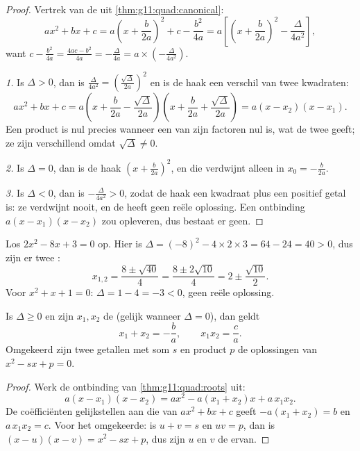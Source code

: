 \begin{proof}
Vertrek van de  uit \cref{thm:g11:quad:canonical}:
\[
ax^2+bx+c
= a\left(x + \frac{b}{2a}\right)^2 + c - \frac{b^2}{4a}
= a\left[\left(x + \frac{b}{2a}\right)^2 - \frac{\Delta}{4a^2}\right],
\]
want $c - \frac{b^2}{4a} = \frac{4ac - b^2}{4a} = -\frac{\Delta}{4a} =
a \times \left(-\frac{\Delta}{4a^2}\right)$.

\emph{1.} Is $\Delta > 0$, dan is $\frac{\Delta}{4a^2} =
\left(\frac{\sqrt\Delta}{2a}\right)^2$ en is de haak een verschil van twee
kwadraten:
\[
ax^2+bx+c = a\left(x + \frac{b}{2a} - \frac{\sqrt\Delta}{2a}\right)
\left(x + \frac{b}{2a} + \frac{\sqrt\Delta}{2a}\right)
= a(x - x_2)(x - x_1).
\]
Een product is nul precies wanneer een van zijn factoren nul is, wat de twee
 geeft; ze zijn verschillend omdat $\sqrt\Delta \neq 0$.

\emph{2.} Is $\Delta = 0$, dan is de haak $\left(x + \frac{b}{2a}\right)^2$,
en die verdwijnt alleen in $x_0 = -\frac{b}{2a}$.

\emph{3.} Is $\Delta < 0$, dan is $-\frac{\Delta}{4a^2} > 0$, zodat de haak
een kwadraat plus een positief getal is: ze verdwijnt nooit, en de
 heeft geen reële oplossing. Een ontbinding $a(x-x_1)(x-x_2)$ zou
 opleveren, dus bestaat er geen.
\end{proof}

\begin{example}\label{ex:g11:quad:solving}
Los $2x^2 - 8x + 3 = 0$ op. Hier is
$\Delta = (-8)^2 - 4 \times 2 \times 3 = 64 - 24 = 40 > 0$, dus zijn er twee
:
\[
x_{1,2} = \frac{8 \pm \sqrt{40}}{4} = \frac{8 \pm 2\sqrt{10}}{4}
= 2 \pm \frac{\sqrt{10}}{2}.
\]
Voor $x^2 + x + 1 = 0$: $\Delta = 1 - 4 = -3 < 0$, geen reële oplossing.
\end{example}

\begin{proposition}\label{prop:g11:quad:vieta}
Is $\Delta \geq 0$ en zijn $x_1, x_2$ de  (gelijk wanneer
$\Delta = 0$), dan geldt
\[
x_1 + x_2 = -\frac{b}{a},
\qquad
x_1 x_2 = \frac{c}{a} .
\]
Omgekeerd zijn twee getallen met som $s$ en product $p$ de oplossingen van
$x^2 - sx + p = 0$.
\end{proposition}

\begin{proof}
Werk de ontbinding van \cref{thm:g11:quad:roots} uit:
\[
a(x - x_1)(x - x_2) = a x^2 - a(x_1 + x_2)x + a\,x_1 x_2 .
\]
De coëfficiënten gelijkstellen aan die van $ax^2 + bx + c$ geeft
$-a(x_1+x_2) = b$ en $a\,x_1x_2 = c$. Voor het omgekeerde: is $u + v = s$ en
$uv = p$, dan is $(x-u)(x-v) = x^2 - sx + p$, dus zijn $u$ en $v$ de 
ervan.
\end{proof}

